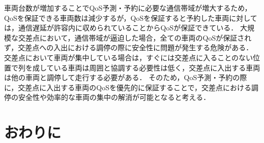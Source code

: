\documentclass[a4paper,11pt,uplatex]{ujreport}
\begin{document}
  車両台数が増加することでQoS予測・予約に必要な通信帯域が増大するため，QoSを保証できる車両数は減少するが，QoSを保証すると予約した車両に対しては，通信遅延が許容内に収められていることからQoSが保証できている．
  大規模な交差点において，通信帯域が逼迫した場合，全ての車両のQoSが保証されず，交差点への入出における調停の際に安全性に問題が発生する危険がある．
  交差点において車両が集中している場合は，すぐには交差点に入ることのない位置で列を成している車両は周囲と協調する必要性は低く，交差点に入出する車両は他の車両と調停して走行する必要がある．
  そのため，QoS予測・予約の際に，交差点に入出する車両のQoSを優先的に保証することで，交差点における調停の安全性や効率的な車両の集中の解消が可能となると考える．

\chapter{おわりに}
\label{chap:おわりに}

\end{document}
